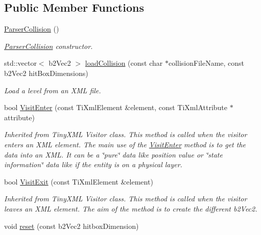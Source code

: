 \subsection*{Public Member Functions}
\begin{DoxyCompactItemize}
\item 
\hyperlink{struct_symp_1_1_parser_collision_aa399d593223247b92a46ff32771b467d}{Parser\-Collision} ()
\begin{DoxyCompactList}\small\item\em \hyperlink{struct_symp_1_1_parser_collision_aa399d593223247b92a46ff32771b467d}{Parser\-Collision} constructor. \end{DoxyCompactList}\item 
std\-::vector$<$ b2\-Vec2 $>$ \hyperlink{struct_symp_1_1_parser_collision_ad2e32aca1664bbb6166ae8f8ccee64fd}{load\-Collision} (const char $\ast$collision\-File\-Name, const b2\-Vec2 hit\-Box\-Dimensions)
\begin{DoxyCompactList}\small\item\em Load a level from an X\-M\-L file. \end{DoxyCompactList}\item 
bool \hyperlink{struct_symp_1_1_parser_collision_aea8246a25b90198580e3d9bd90b03a1e}{Visit\-Enter} (const Ti\-Xml\-Element \&element, const Ti\-Xml\-Attribute $\ast$attribute)
\begin{DoxyCompactList}\small\item\em Inherited from Tiny\-X\-M\-L Visitor class. This method is called when the visitor enters an X\-M\-L element. The main use of the \hyperlink{struct_symp_1_1_parser_collision_aea8246a25b90198580e3d9bd90b03a1e}{Visit\-Enter} method is to get the data into an X\-M\-L. It can be a \char`\"{}pure\char`\"{} data like position value or \char`\"{}state information\char`\"{} data like if the entity is on a physical layer. \end{DoxyCompactList}\item 
bool \hyperlink{struct_symp_1_1_parser_collision_ac1a8ff5684c792fed383b10e4045db41}{Visit\-Exit} (const Ti\-Xml\-Element \&element)
\begin{DoxyCompactList}\small\item\em Inherited from Tiny\-X\-M\-L Visitor class. This method is called when the visitor leaves an X\-M\-L element. The aim of the method is to create the different b2\-Vec2. \end{DoxyCompactList}\item 
void \hyperlink{struct_symp_1_1_parser_collision_a99a9c0b320eeecbeb09101300a87783d}{reset} (const b2\-Vec2 hitbox\-Dimension)
\end{DoxyCompactItemize}


